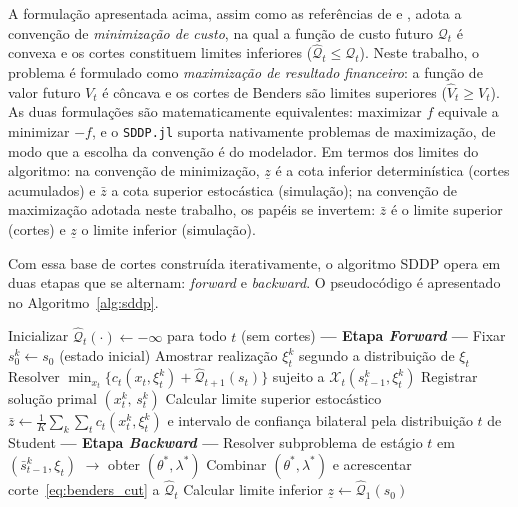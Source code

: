 A formulação apresentada acima, assim como as referências de  e , adota a convenção de \emph{minimização de custo}, na qual a função de custo futuro $\mathcal{Q}_t$ é convexa e os cortes constituem limites inferiores ($\hat{\mathcal{Q}}_t \leq \mathcal{Q}_t$). Neste trabalho, o problema é formulado como \emph{maximização de resultado financeiro}: a função de valor futuro $V_t$ é côncava e os cortes de Benders são limites superiores ($\hat{V}_t \geq V_t$). As duas formulações são matematicamente equivalentes: maximizar $f$ equivale a minimizar $-f$, e o \texttt{SDDP.jl} suporta nativamente problemas de maximização, de modo que a escolha da convenção é do modelador. Em termos dos limites do algoritmo: na convenção de minimização, $\underline{z}$ é a cota inferior determinística (cortes acumulados) e $\bar{z}$ a cota superior estocástica (simulação); na convenção de maximização adotada neste trabalho, os papéis se invertem: $\bar{z}$ é o limite superior (cortes) e $\underline{z}$ o limite inferior (simulação).

Com essa base de cortes construída iterativamente, o algoritmo SDDP opera em duas etapas que se alternam: \textit{forward} e \textit{backward}. O pseudocódigo é apresentado no Algoritmo~\ref{alg:sddp}.

\begin{algorithm}[H]
\caption{SDDP (\emph{Stochastic Dual Dynamic Programming}), apresentado na convenção de minimização de . A implementação deste trabalho utiliza maximização de resultado financeiro; ver Seção~\ref{sec:pdde}.}
\label{alg:sddp}
\begin{algorithmic}[1]
  \State Inicializar $\hat{\mathcal{Q}}_t(\cdot) \leftarrow -\infty$ para todo $t$ (sem cortes)
  \Repeat
    \State \textbf{--- Etapa \textit{Forward} ---}
      \State Fixar $s_0^k \leftarrow s_0$ (estado inicial)
        \State Amostrar realização $\xi_t^k$ segundo a distribuição de $\xi_t$
        \State Resolver $\min_{x_t} \bigl\{ c_t(x_t, \xi_t^k) + \hat{\mathcal{Q}}_{t+1}(s_t) \bigr\}$ sujeito a $\mathcal{X}_t(s_{t-1}^k, \xi_t^k)$
        \State Registrar solução primal $(x_t^k,\, s_t^k)$
      \EndFor
    \EndFor
    \State Calcular limite superior estocástico $\bar{z} \leftarrow \frac{1}{K}\sum_k \sum_t c_t(x_t^k, \xi_t^k)$ e intervalo de confiança bilateral pela distribuição $t$ de Student
    \State \textbf{--- Etapa \textit{Backward} ---}
          \State Resolver subproblema de estágio $t$ em $(\bar{s}_{t-1}^k, \xi_t)$ $\rightarrow$ obter $(\theta^*, \lambda^*)$
        \EndFor
        \State Combinar $(\theta^*, \lambda^*)$ e acrescentar corte~\eqref{eq:benders_cut} a $\hat{\mathcal{Q}}_t$
      \EndFor
    \EndFor
    \State Calcular limite inferior $\underline{z} \leftarrow \hat{\mathcal{Q}}_1(s_0)$
\end{algorithmic}
\end{algorithm}

